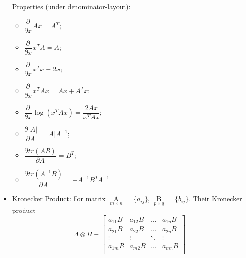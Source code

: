 \begin{itemize}[topsep=6pt,itemsep=4pt]
        Properties (under denominator-layout):
        \begin{itemize}[topsep=6pt,itemsep=2.5pt]
            \item $ \dfrac{\partial^{} }{\partial x^{}}Ax=A^T $;\\
            \item $ \dfrac{\partial^{} }{\partial x^{}}x^TA=A $;\\
            \item $ \dfrac{\partial^{} }{\partial x^{}}x^Tx=2x $;\\
            \item $ \dfrac{\partial^{} }{\partial x^{}}x^TAx=Ax+A^Tx $;\\
            \item $ \dfrac{\partial^{} }{\partial x^{}}\log(x^TAx)=\dfrac{2Ax}{x^TAx} $;\\
            \item $ \dfrac{\partial^{} |A|}{\partial A^{}}=|A|A^{-1} $;\\
            \item $ \dfrac{\partial^{} tr(AB)}{\partial A^{}}=B^T $;\\
            \item $ \dfrac{\partial^{} tr(A^{-1}B)}{\partial A^{}}=-A^{-1}B^TA^{-1} $
        \end{itemize}
          
        
        \item Kronecker Product: For matrix $ \mathop{A}\limits_{m\times n}=\{a_{ij}\},\,\mathop{B}\limits_{p\times q}=\{b_{ij}\} $. Their Kronecker product
        \[
            A\otimes B=\begin{bmatrix}
            a_{11}B&a_{12}B&\ldots&a_{1n}B \\
            a_{21}B&a_{22}B&\ldots&a_{2n}B \\
            \vdots&\vdots&\ddots&\vdots\\
            a_{1m}B&a_{m2}B&\ldots&a_{mn}B \\
            \end{bmatrix} 
        \]
        
    \end{itemize}
    
        


